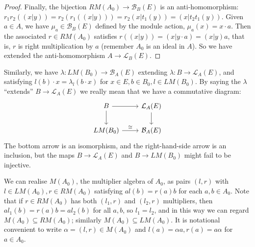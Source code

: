 \documentclass[a4paper,11pt]{article}
\theoremstyle{plain}
\theoremstyle{remark}
\newcommand{\mc}[1]{\mathcal{#1}}
\begin{document}
\begin{proof}
Finally, the bijection $RM(A_0) \to \mc B_B(E)$ is an anti-homomorphism: $r_1r_2((x|y)) = r_2( r_1( (x|y) ) ) = r_2 (x|t_1(y)) = (x|t_2t_1(y))$.  Given $a\in A$, we have $\mu_a \in \mc B_B(E)$ defined by the module action, $\mu_a(x) = x\cdot a$.  Then the associated $r\in RM(A_0)$ satisfies $r((x|y)) = (x|y\cdot a) = (x|y)a$, that is, $r$ is right multiplication by $a$ (remember $A_0$ is an ideal in $A$).  So we have extended the anti-homomorphism $A \to \mc L_B(E)$.  %
\end{proof}

Similarly, we have $\lambda \colon LM(B_0) \to \mc B_A(E)$ extending $\lambda \colon B \to \mc L_A(E)$, and satisfying $l(b)\cdot x = \lambda_l(b\cdot x)$ for $x\in E, b\in B_0, l\in LM(B_0)$.  By saying the $\lambda$ ``extends'' $B\to\mc L_A(E)$ we really mean that we have a commutative diagram:
\[ \begin{tikzcd}
  B \ar[r] \ar[d]  & \mc L_A(E) \ar[d] \\
  LM(B_0) \ar[r, "\cong"] & \mc B_A(E)
\end{tikzcd} \]
The bottom arrow is an isomorphism, and the right-hand-side arrow is an inclusion, but the maps $B\to\mc L_A(E)$ and $B\to LM(B_0)$ might fail to be injective.

We can realise $M(A_0)$, the multiplier algebra of $A_0$, as pairs $(l,r)$ with $l\in LM(A_0), r\in RM(A_0)$ satisfying $a l(b) = r(a)b$ for each $a,b\in A_0$.  Note that if $r\in RM(A_0)$ has both $(l_1,r)$ and $(l_2,r)$ multipliers, then $a l_1(b) = r(a)b = a l_2(b)$ for all $a,b$, so $l_1 = l_2$, and in this way we can regard $M(A_0) \subseteq RM(A_0)$; similarly $M(A_0) \subseteq LM(A_0)$.  It is notational convenient to write $\alpha = (l,r) \in M(A_0)$ and $l(a) = \alpha a, r(a) = a\alpha$ for $a\in A_0$.
\end{document}
